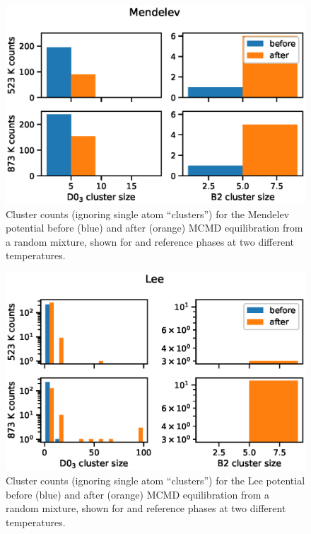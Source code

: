 %
\begin{figure}[h]
    \centering
    \includegraphics[width=\textwidth]{figures/mendelev_hist_thresh13}
    \caption{Cluster counts (ignoring single atom ``clusters'') for the Mendelev potential before (blue) and after (orange) MCMD equilibration from a random mixture, shown for \DOTHREE and \BTWO reference phases at two different temperatures.}
    \label{fig:mendelev_hist}
\end{figure}
%
\begin{figure}[h]
    \centering
    \includegraphics[width=\textwidth]{figures/lee_hist_thresh13}
    \caption{Cluster counts (ignoring single atom ``clusters'') for the Lee potential before (blue) and after (orange) MCMD equilibration from a random mixture, shown for \DOTHREE and \BTWO reference phases at two different temperatures.}
    \label{fig:lee_hist}
\end{figure}

